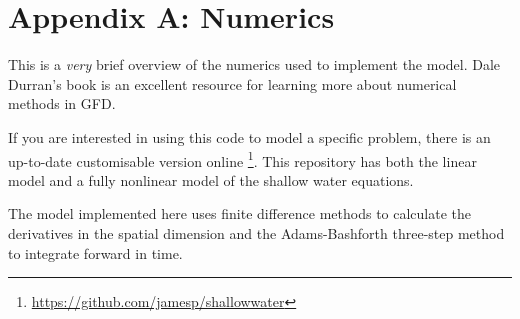 \documentclass[a4paper, sfsidenotes, twoside]{tufte-handout}
\begin{document}
  \section{Appendix A: Numerics}
  \label{sec:appendixa}

  \noindent This is a \emph{very} brief overview of the numerics used to implement the model.
  Dale Durran's book \cite{Durran:2010hy} is an excellent resource for learning more about numerical methods in GFD.

  If you are interested in using this code to model a specific problem, there is an up-to-date customisable version online \footnote{\url{https://github.com/jamesp/shallowwater}}.
  This repository has both the linear model and a fully nonlinear model of the shallow water equations.

  \noindent The model implemented here uses finite difference methods to calculate the derivatives in the spatial dimension and the Adams-Bashforth three-step method to integrate forward in time.
\end{document}
